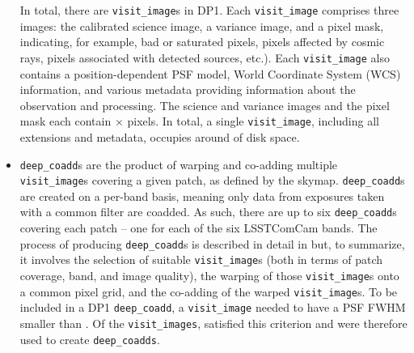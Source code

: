 \begin{itemize}
In total, there are \nvisitimages \texttt{visit\_image}s in DP1.
Each \texttt{visit\_image}  comprises three images: the calibrated science image, a variance image, and a pixel mask, indicating, for example, bad or saturated pixels, pixels affected by cosmic rays, pixels associated with detected sources, etc.).
Each \texttt{visit\_image} also contains a position-dependent PSF model, World Coordinate System (WCS) information, and various metadata providing information about the observation and processing.
The science and variance images and the pixel mask each contain \nvisitimagepixx$\times$ \nvisitimagepixy pixels.
In total, a single \texttt{visit\_image}, including all extensions and metadata, occupies around \visitimagehdd of disk space.





\item \texttt{deep\_coadd}s are the product of warping and co-adding multiple \texttt{visit\_image}s covering a given patch, as defined by the skymap.
\texttt{deep\_coadd}s are created on a per-band basis, meaning only data from exposures taken with a common filter are coadded.
As such, there are up to six \texttt{deep\_coadd}s covering each patch -- one for each of the six LSSTComCam bands.
The process of producing \texttt{deep\_coadd}s is described in detail in  but, to summarize, it involves the selection of suitable \texttt{visit\_image}s (both in terms of patch coverage, band, and image quality), the warping of those \texttt{visit\_image}s onto a common pixel grid, and the co-adding of the warped \texttt{visit\_image}s.
To be included in a DP1 \texttt{deep\_coadd}, a \texttt{visit\_image} needed to have a PSF FWHM smaller than \deepcoaddmaxfwhm. Of the \nvisitimages \texttt{visit\_images}, \nselectedvisitimages satisfied this criterion and were therefore used to create \texttt{deep\_coadds}.


\end{itemize}
